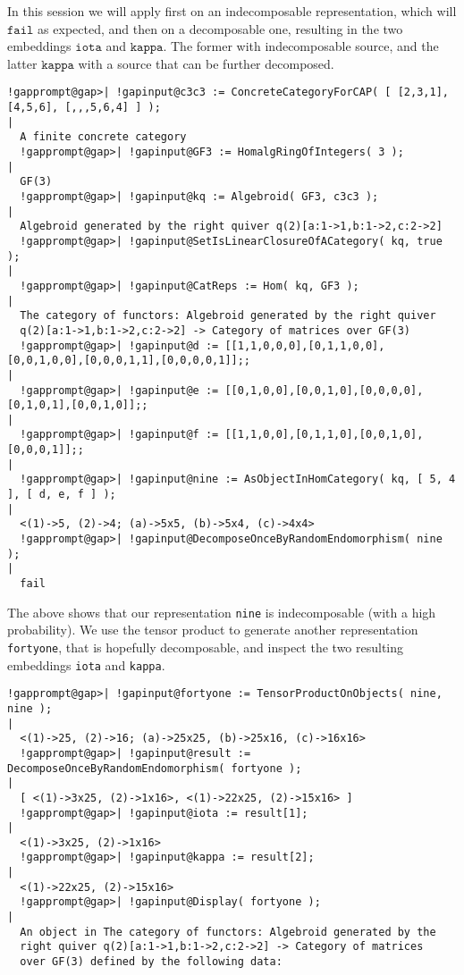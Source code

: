 \begin{computation} In this \Gap{} session we will apply 
first on an indecomposable representation, which will $\mathtt{fail}$ as expected, and then on a decomposable one,
resulting in the two embeddings $\mathtt{iota}$ and $\mathtt{kappa}$. The former with indecomposable source,
and the latter $\mathtt{kappa}$ with a source that can be further decomposed.\\

\begin{Verbatim}[commandchars=!@|,fontsize=\small,frame=single,label=Example]
  !gapprompt@gap>| !gapinput@c3c3 := ConcreteCategoryForCAP( [ [2,3,1], [4,5,6], [,,,5,6,4] ] );
|
  A finite concrete category
  !gapprompt@gap>| !gapinput@GF3 := HomalgRingOfIntegers( 3 );
|
  GF(3)
  !gapprompt@gap>| !gapinput@kq := Algebroid( GF3, c3c3 );
|
  Algebroid generated by the right quiver q(2)[a:1->1,b:1->2,c:2->2]
  !gapprompt@gap>| !gapinput@SetIsLinearClosureOfACategory( kq, true );
|
  !gapprompt@gap>| !gapinput@CatReps := Hom( kq, GF3 );
|
  The category of functors: Algebroid generated by the right quiver
  q(2)[a:1->1,b:1->2,c:2->2] -> Category of matrices over GF(3)
  !gapprompt@gap>| !gapinput@d := [[1,1,0,0,0],[0,1,1,0,0],[0,0,1,0,0],[0,0,0,1,1],[0,0,0,0,1]];;
|
  !gapprompt@gap>| !gapinput@e := [[0,1,0,0],[0,0,1,0],[0,0,0,0],[0,1,0,1],[0,0,1,0]];;
|
  !gapprompt@gap>| !gapinput@f := [[1,1,0,0],[0,1,1,0],[0,0,1,0],[0,0,0,1]];;
|
  !gapprompt@gap>| !gapinput@nine := AsObjectInHomCategory( kq, [ 5, 4 ], [ d, e, f ] );
|
  <(1)->5, (2)->4; (a)->5x5, (b)->5x4, (c)->4x4>
  !gapprompt@gap>| !gapinput@DecomposeOnceByRandomEndomorphism( nine );
|
  fail
\end{Verbatim}
 The above shows that our representation \texttt{nine} is indecomposable (with a high probability). We use the tensor product to generate another
representation \texttt{fortyone}, that is hopefully decomposable, and inspect the two resulting embeddings \texttt{iota} and \texttt{kappa}. 
\begin{Verbatim}[commandchars=!@|,fontsize=\small,frame=single,label=Example]
  !gapprompt@gap>| !gapinput@fortyone := TensorProductOnObjects( nine, nine );
|
  <(1)->25, (2)->16; (a)->25x25, (b)->25x16, (c)->16x16>
  !gapprompt@gap>| !gapinput@result := DecomposeOnceByRandomEndomorphism( fortyone );
|
  [ <(1)->3x25, (2)->1x16>, <(1)->22x25, (2)->15x16> ]
  !gapprompt@gap>| !gapinput@iota := result[1];
|
  <(1)->3x25, (2)->1x16>
  !gapprompt@gap>| !gapinput@kappa := result[2];
|
  <(1)->22x25, (2)->15x16>
  !gapprompt@gap>| !gapinput@Display( fortyone );
|
  An object in The category of functors: Algebroid generated by the
  right quiver q(2)[a:1->1,b:1->2,c:2->2] -> Category of matrices
  over GF(3) defined by the following data:
  

\end{Verbatim}
\end{computation}

